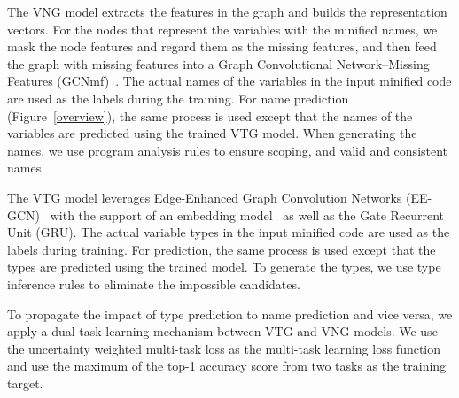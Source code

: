 The VNG model extracts the features in the graph and builds the
representation vectors. For the nodes that represent the variables
with the minified names, we mask the node features and regard them as
the missing features, and then feed the graph with missing features
into a Graph Convolutional Network--Missing Features
(GCNmf)~\cite{GCNmf}. The actual names of the variables in the input
minified code are used as the labels during the training. For name
prediction (Figure~\ref{overview}), the same process is used except
that the names of the variables are predicted using the trained VTG
model. When generating the names, we use program analysis rules to
ensure scoping, and valid and consistent names.

The VTG model leverages Edge-Enhanced Graph Convolution Networks
(EE-GCN)~\cite{ee-gcn} with the support of an embedding
model~\cite{pennington2014glove} as well as the Gate Recurrent Unit
(GRU). The actual variable types in the input minified code
are used as the labels during training. For prediction, the same
process is used except that the types are predicted
using the trained model. To generate the types, we use type
inference rules to eliminate the impossible candidates.

To propagate the impact of type prediction to name prediction and vice
versa, we apply a dual-task learning mechanism between VTG and VNG
models.  We use the uncertainty weighted multi-task loss as the
multi-task learning loss function and use the maximum of the top-1
accuracy score from two tasks as the training target.







